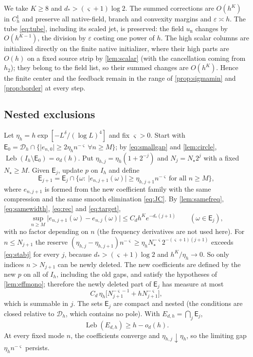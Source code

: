 \documentclass[11pt]{amsart}
\numberwithin{equation}{section}
\theoremstyle{definition}
\theoremstyle{remark}
\newcommand{\eps}{\varepsilon}
\newcommand{\abs}[1]{\lvert #1\rvert}
\newcommand{\Leb}{\operatorname{Leb}}
\newcommand{\Dh}{\mathcal D_h}
\begin{document}
We take $K\ge8$ and $d_*>(\varsigma+1)\log2$. The summed corrections are $O(h^K)$ in $C^1_h$ and preserve all native-field, branch and convexity margins and $\eps\asymp h$. The tube \eqref{eq:tube}, including its scaled jet, is preserved: the field $u_{\mathrm n}$ changes by $O(h^{K-1})$, the division by $\eps$ costing one power of $h$. The high scalar columns are initialized directly on the finite native initializer, where their high parts are $O(h)$ on a fixed source strip by \cref{lem:scalar} (with the cancellation coming from $h_2$); they belong to the field list, so their summed changes are $O(h^K)$. Hence the finite center and the feedback remain in the range of \cref{prop:sigmamin} and \cref{prop:border} at every step.

\subsection{Nested exclusions}
Let $\eta_h=h\exp[-L^\delta/(\log L)^4]$ and fix $\varsigma>0$. Start with $\mathsf E_0=\Dh\cap\{\abs{e_{n,0}}\ge2\eta_hn^{-\varsigma}\ \forall n\ge M\}$; by \eqref{eq:smallgap} and \cref{lem:circle}, $\Leb(I_h\setminus\mathsf E_0)=o_d(h)$. Put $\eta_{h,j}=\eta_h(1+2^{-j})$ and $N_j=N_\star2^j$ with a fixed $N_\star\ge M$. Given $\mathsf E_j$, update $p$ on $I_h$ and define
\[
\mathsf E_{j+1}=\mathsf E_j\cap\{\omega:\ \abs{e_{n,j+1}(\omega)}\ge\eta_{h,j+1}n^{-\varsigma}\ \text{for all }n\ge M\},
\]
where $e_{n,j+1}$ is formed from the new coefficient family with the same compression and the same smooth elimination \eqref{eq:JC}. By \cref{lem:samefreq}, \eqref{eq:samewidth}, \eqref{eq:rec} and \eqref{eq:target},
\begin{equation}\label{eq:stabj}
\sup_{n\ge M}\abs{e_{n,j+1}(\omega)-e_{n,j}(\omega)}\le C_dh^Ke^{-d_*(j+1)}\qquad(\omega\in\mathsf E_j),
\end{equation}
with no factor depending on $n$ (the frequency derivatives are not used here). For $n\le N_{j+1}$ the reserve $(\eta_{h,j}-\eta_{h,j+1})n^{-\varsigma}\ge\eta_hN_\star^{-\varsigma}2^{-(\varsigma+1)(j+1)}$ exceeds \eqref{eq:stabj} for every $j$, because $d_*>(\varsigma+1)\log2$ and $h^K/\eta_h\to0$. So only indices $n>N_{j+1}$ can be newly deleted. The new coefficients are defined by the new $p$ on all of $I_h$, including the old gaps, and satisfy the hypotheses of \cref{lem:effmono}; therefore the newly deleted part of $\mathsf E_j$ has measure at most
\begin{equation}\label{eq:newloss}
C_d\,\eta_h\bigl[N_{j+1}^{-\varsigma-1}+hN_{j+1}^{-\varsigma}\bigr],
\end{equation}
which is summable in $j$. The sets $\mathsf E_j$ are compact and nested (the conditions are closed relative to $\Dh$, which contains no pole). With $E_{d,h}=\bigcap_j\mathsf E_j$,
\begin{equation}\label{eq:measure}
\Leb(E_{d,h})\ge h-o_d(h).
\end{equation}
At every fixed mode $n$, the coefficients converge and $\eta_{h,j}\downarrow\eta_h$, so the limiting gap $\eta_hn^{-\varsigma}$ persists.
\end{document}
